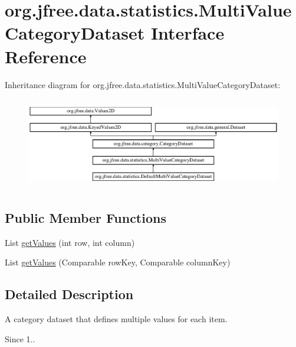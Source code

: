 \hypertarget{interfaceorg_1_1jfree_1_1data_1_1statistics_1_1_multi_value_category_dataset}{}\section{org.\+jfree.\+data.\+statistics.\+Multi\+Value\+Category\+Dataset Interface Reference}
\label{interfaceorg_1_1jfree_1_1data_1_1statistics_1_1_multi_value_category_dataset}
Inheritance diagram for org.\+jfree.\+data.\+statistics.\+Multi\+Value\+Category\+Dataset\+:\begin{figure}[H]
\begin{center}
\leavevmode
\includegraphics[height=4.046243cm]{interfaceorg_1_1jfree_1_1data_1_1statistics_1_1_multi_value_category_dataset}
\end{center}
\end{figure}
\subsection*{Public Member Functions}
\begin{DoxyCompactItemize}
\item 
List \mbox{\hyperlink{interfaceorg_1_1jfree_1_1data_1_1statistics_1_1_multi_value_category_dataset_ad84c58a61b652cdb78a8ed459510fb74}{get\+Values}} (int row, int column)
\item 
List \mbox{\hyperlink{interfaceorg_1_1jfree_1_1data_1_1statistics_1_1_multi_value_category_dataset_a59a071f5642de62b2f79d3fae9e3fdbf}{get\+Values}} (Comparable row\+Key, Comparable column\+Key)
\end{DoxyCompactItemize}


\subsection{Detailed Description}
A category dataset that defines multiple values for each item.

\begin{DoxySince}{Since}
1.. 
\end{DoxySince}


